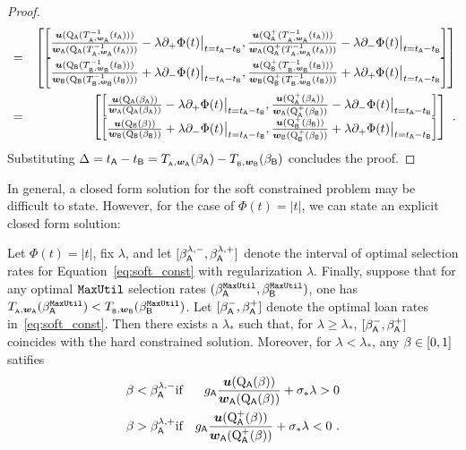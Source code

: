 \begin{proof}
\begin{eqnarray*}
	&=& \begin{bmatrix}
	\left[\frac{\util(\RCDF\supa(\constfa^{-1}(t\supa)))}{\boldwa(\RCDF\supa(\constfa^{-1}(t\supa)))} - \lambda  \partial_+  \Phi(t)\big{|}_{t = t\supa - t\supb} , \frac{\util(\RCDFpl\supa(\constfa^{-1}(t\supa)))}{\boldwa(\RCDFpl\supa(\constfa^{-1}(t\supa)))}  - \lambda  \partial_-  \Phi(t)\big{|}_{t = t\supa - t\supb}\right] \\
	\left[\frac{\util(\RCDF\supb(\constfb^{-1}(t\supb)))}{\boldwb(\RCDF\supb(\constfb^{-1}(t\supb)))} + \lambda \partial_- \Phi(t) \big{|}_{t = t\supa - t\supb}, \frac{\util(\RCDFpl\supb(\constfb^{-1}(t\supb)))}{\boldwb(\RCDFpl\supb(\constfb^{-1}(t\supb)))}  + \lambda \partial_+ \Phi(t) \big{|}_{t = t\supa - t\supb}\right] \\
	\end{bmatrix}\\
	&=& \begin{bmatrix}
	\left[\frac{\util(\RCDF\supa(\accratea))}{\boldwa(\RCDF\supa(\accratea))} - \lambda  \partial_+  \Phi(t)\big{|}_{t = t\supa - t\supb} , \frac{\util(\RCDFpl\supa(\accratea))}{\boldwa(\RCDFpl\supa(\accrateb))}  - \lambda  \partial_-  \Phi(t)\big{|}_{t = t\supa - t\supb}\right] \\
	\left[\frac{\util(\RCDF\supb(\accrate))}{\boldwb(\RCDF\supb(\accrateb))} + \lambda \partial_- \Phi(t) \big{|}_{t = t\supa - t\supb}, \frac{\util(\RCDFpl\supb(\accrateb))}{\boldwb(\RCDFpl\supb(\accrateb))}  + \lambda \partial_+ \Phi(t) \big{|}_{t = t\supa - t\supb}\right] 
	\end{bmatrix}~.
	\end{eqnarray*}
	Substituting $\Delta = t\supa - t\supb = \constfa(\accratea) - \constfb(\accrateb)$ concludes the proof. 
	\end{proof}
	In general, a closed form solution for the soft constrained problem may be difficult to state. However, for the case of $\Phi(t) = |t|$, we can state an explicit closed form solution:
	\begin{prop}[Special case of $\Phi(t) = |t|$]\label{prop:abs_val_soft_constrainted} Let $\Phi(t) = |t|$, fix $\lambda$, and let $[\accratea^{\lambda,-},\accratea^{\lambda,+}]$ denote the interval of optimal selection rates for Equation~\eqref{eq:soft_const} with regularization $\lambda$. Finally, suppose that for any optimal $\maxprof$ selection rates $(\accratea^\maxprof,\accrateb^\maxprof)$, one has $\constfa(\accratea^\maxprof) < \constfb(\accrateb^\maxprof)$.  
	Let $[\accratea^-,\accratea^+]$ denote the optimal loan rates in~\eqref{eq:soft_const}. Then there exists a $\lambda_*$ such that, for $\lambda \ge \lambda_*$,  $[\accratea^-,\accratea^+]$ coincides with the hard constrained solution. Moreover, for $\lambda < \lambda_*$, any $\accrate \in [0,1]$ satifies
	\begin{eqnarray*}
		\accrate < \accratea^{\lambda,-} &\text{if}& \fraca\frac{\util(\RCDF\supa(\accrate))}{\boldwa(\RCDF\supa(\accrate))} + \sigma_* \lambda > 0 \\
		\accrate > \accratea^{\lambda,+} &\text{if}& \fraca\frac{\util(\RCDFpl\supa(\accrate))}{\boldwa(\RCDFpl\supa(\accrate))} + \sigma_* \lambda < 0 ~.
		\end{eqnarray*}
	\end{prop}
